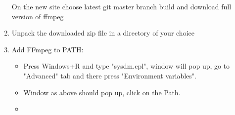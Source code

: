 \documentclass[a4paper,12pt]{book}
\begin{document}
\begin{enumerate}
	On the new site choose latest git master branch build and download full version of ffmpeg
	\item Unpack the downloaded zip file in a directory of your choice
	\item Add FFmpeg to PATH:
	\begin{itemize}
		\item Press Windows+R and type "sysdm.cpl", window will pop up, go to "Advanced" tab and there press "Environment variables".
		\item \begin{minipage}[t]{\linewidth}
			\raggedright
			\medskip	
		\end{minipage}
		Window as above should pop up, click on the Path.
		\item \begin{minipage}[t]{\linewidth}
			\raggedright
\end{minipage}
\end{itemize}
\end{enumerate}
\end{document}
